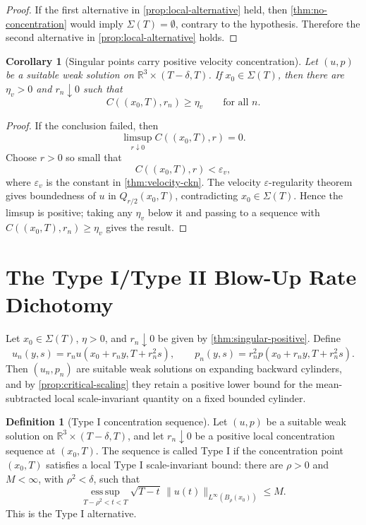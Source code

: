 \documentclass[11pt]{amsart}
\theoremstyle{plain}
\newtheorem{corollary}[corollary]{Corollary}
\theoremstyle{definition}
\newtheorem{definition}[definition]{Definition}
\theoremstyle{remark}
\begin{document}
\begin{proof}
If the first alternative in \cref{prop:local-alternative} held, then
\cref{thm:no-concentration} would imply \(\Sigma(T)=\emptyset\), contrary to
the hypothesis.  Therefore the second alternative in
\cref{prop:local-alternative} holds.
\end{proof}

\begin{corollary}[Singular points carry positive velocity concentration]
\label{cor:velocity-concentration}
Let \((u,p)\) be a suitable weak solution on
\(\mathbb R^3\times(T-\delta,T)\).  If \(x_0\in\Sigma(T)\), then there are
\(\eta_v>0\) and \(r_n\downarrow0\) such that
\[
  C((x_0,T),r_n)\ge\eta_v
  \qquad\text{for all }n.
\]
\end{corollary}

\begin{proof}
If the conclusion failed, then
\[
  \limsup_{r\downarrow0} C((x_0,T),r)=0.
\]
Choose \(r>0\) so small that
\[
  C((x_0,T),r)<\varepsilon_v,
\]
where \(\varepsilon_v\) is the constant in
\cref{thm:velocity-ckn}.  The velocity \(\varepsilon\)-regularity theorem gives
boundedness of \(u\) in \(Q_{r/2}(x_0,T)\), contradicting
\(x_0\in\Sigma(T)\).  Hence the limsup is positive; taking any
\(\eta_v\) below it and passing to a sequence with
\(C((x_0,T),r_n)\ge\eta_v\) gives the result.
\end{proof}

\section{The Type I/Type II Blow-Up Rate Dichotomy}

Let \(x_0\in\Sigma(T)\), \(\eta>0\), and \(r_n\downarrow0\) be given by
\cref{thm:singular-positive}.  Define
\[
  u_n(y,s)=r_nu(x_0+r_ny,T+r_n^2s),
  \qquad
  p_n(y,s)=r_n^2p(x_0+r_ny,T+r_n^2s).
\]
Then \((u_n,p_n)\) are suitable weak solutions on expanding backward
cylinders, and by \cref{prop:critical-scaling} they retain a positive lower
bound for the mean-subtracted local scale-invariant quantity on a fixed
bounded cylinder.

\begin{definition}[Type I concentration sequence]
\label{def:typeI-concentration}
Let \((u,p)\) be a suitable weak solution on
\(\mathbb R^3\times(T-\delta,T)\), and let \(r_n\downarrow0\) be a positive
local concentration sequence at \((x_0,T)\).  The sequence is called Type I
if the concentration point \((x_0,T)\) satisfies a local Type I
scale-invariant bound:
there are \(\rho>0\) and \(M<\infty\), with \(\rho^2<\delta\), such that
\[
  \operatorname*{ess\,sup}_{T-\rho^2<t<T}
  \sqrt{T-t}\,\|u(t)\|_{L^\infty(B_\rho(x_0))}\le M.
\]
This is the Type I alternative.
\end{definition}
\end{document}
